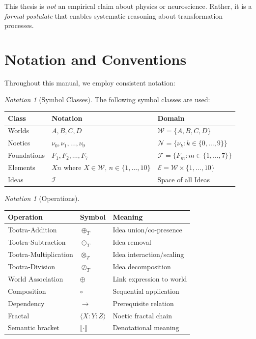 \documentclass[11pt,twoside,openright]{book}
\theoremstyle{definition}
\theoremstyle{plain}
\theoremstyle{remark}
\newtheorem{notation}[definition]{Notation}
\newcommand{\sem}[1]{\llbracket #1 \rrbracket}
\newcommand{\Worlds}{\mathcal{W}}
\newcommand{\Ideas}{\mathcal{I}}
\newcommand{\Elements}{\mathcal{E}}
\newcommand{\Noetics}{\mathcal{N}}
\newcommand{\Foundations}{\mathcal{F}}
\newcommand{\noe}[1]{\nu_{#1}}
\newcommand{\Tadd}{\oplus_T}
\newcommand{\Tsub}{\ominus_T}
\newcommand{\Tmul}{\otimes_T}
\newcommand{\Tdiv}{\oslash_T}
\begin{document}
This thesis is \emph{not} an empirical claim about physics or neuroscience. Rather, it is a \emph{formal postulate} that enables systematic reasoning about transformation processes.

\section{Notation and Conventions}
\label{sec:notation}

Throughout this manual, we employ consistent notation:

\begin{notation}[Symbol Classes]
\label{not:symbols}
The following symbol classes are used:
\begin{center}
\begin{tabular}{lll}
\toprule
\textbf{Class} & \textbf{Notation} & \textbf{Domain} \\
\midrule
Worlds & $A, B, C, D$ & $\Worlds = \{A, B, C, D\}$ \\
Noetics & $\noe{0}, \noe{1}, \ldots, \noe{9}$ & $\Noetics = \{\noe{k} : k \in \{0,\ldots,9\}\}$ \\
Foundations & $F_1, F_2, \ldots, F_7$ & $\Foundations = \{F_m : m \in \{1,\ldots,7\}\}$ \\
Elements & $Xn$ where $X \in \Worlds$, $n \in \{1,\ldots,10\}$ & $\Elements = \Worlds \times \{1,\ldots,10\}$ \\
Ideas & $\Ideas$ & Space of all Ideas \\
\bottomrule
\end{tabular}
\end{center}
\end{notation}

\begin{notation}[Operations]
\label{not:operations}
\begin{center}
\begin{tabular}{lll}
\toprule
\textbf{Operation} & \textbf{Symbol} & \textbf{Meaning} \\
\midrule
Tootra-Addition & $\Tadd$ & Idea union/co-presence \\
Tootra-Subtraction & $\Tsub$ & Idea removal \\
Tootra-Multiplication & $\Tmul$ & Idea interaction/scaling \\
Tootra-Division & $\Tdiv$ & Idea decomposition \\
World Association & $\oplus$ & Link expression to world \\
Composition & $\circ$ & Sequential application \\
Dependency & $\to$ & Prerequisite relation \\
Fractal & $\langle X : Y : Z \rangle$ & Noetic fractal chain \\
Semantic bracket & $\sem{\cdot}$ & Denotational meaning \\
\bottomrule
\end{tabular}
\end{center}
\end{notation}
\end{document}
